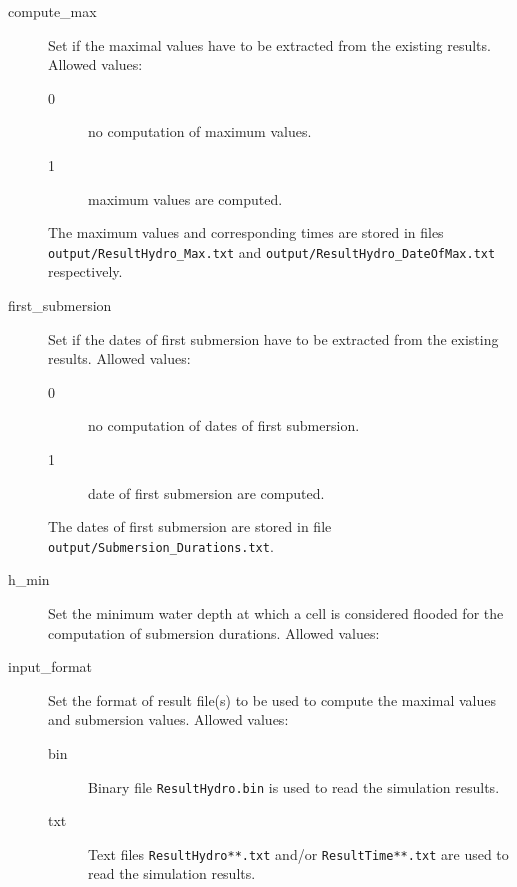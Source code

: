 \begin{description}

\item[compute\_max]  Set if the maximal values have to be extracted from the existing results. Allowed values:
\begin{description}
\item[0] no computation of maximum values.
\item[1] maximum values are computed.
\end{description}
The maximum values and corresponding times are stored in files \texttt{output/ResultHydro\_Max.txt} and \texttt{output/ResultHydro\_DateOfMax.txt} respectively.

\item[first\_submersion]  Set if the dates of first submersion have to be extracted from the existing results. Allowed values:
\begin{description}
\item[0] no computation of dates of first submersion.
\item[1] date of first submersion are computed.
\end{description}
The dates of first submersion are stored in file \texttt{output/Submersion\_Durations.txt}.

\item[h\_min]  Set the minimum water depth at which a cell is considered flooded for the computation of submersion durations. Allowed values:

\item[input\_format]  Set the format of result file(s) to be used to compute the maximal values and submersion values. Allowed values:
\begin{description}
\item[bin] Binary file \texttt{ResultHydro.bin} is used to read the simulation results.
\item[txt] Text files \texttt{ResultHydro**.txt} and/or \texttt{ResultTime**.txt} are used to read the simulation results.
\end{description}


\end{description}
